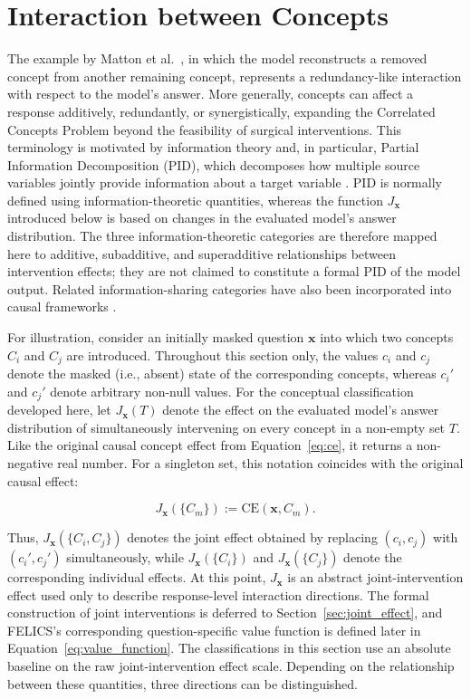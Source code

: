\section{Interaction between Concepts}
\label{sec:interaction_effects}
The example by Matton et al.~\cite{mattonWalkTalkMeasuring2024}, in which the model reconstructs a removed concept from another remaining concept, represents a redundancy-like interaction with respect to the model's answer. More generally, concepts can affect a response additively, redundantly, or synergistically, expanding the Correlated Concepts Problem beyond the feasibility of surgical interventions. This terminology is motivated by information theory and, in particular, Partial Information Decomposition (PID), which decomposes how multiple source variables jointly provide information about a target variable \cite{williamsNonnegativeDecompositionMultivariate2010, kolchinskyNovelApproachPartial2022}. PID is normally defined using information-theoretic quantities, whereas the function $J_{\mathbf{x}}$ introduced below is based on changes in the evaluated model's answer distribution. The three information-theoretic categories are therefore mapped here to additive, subadditive, and superadditive relationships between intervention effects; they are not claimed to constitute a formal PID of the model output. Related information-sharing categories have also been incorporated into causal frameworks \cite{martinez-sanchezDecomposingCausalityIts2024}.

For illustration, consider an initially masked question $\mathbf{x}$ into which two concepts $C_i$ and $C_j$ are introduced. Throughout this section only, the values $c_i$ and $c_j$ denote the masked (i.e., absent) state of the corresponding concepts, whereas $c_i'$ and $c_j'$ denote arbitrary non-null values. For the conceptual classification developed here, let $J_{\mathbf{x}}(T)$ denote the effect on the evaluated model's answer distribution of simultaneously intervening on every concept in a non-empty set $T$. Like the original causal concept effect from Equation~\ref{eq:ce}, it returns a non-negative real number. For a singleton set, this notation coincides with the original causal effect:

\begin{equation}
	J_{\mathbf{x}}(\{C_m\}) := \mathrm{CE}(\mathbf{x},C_m).
\end{equation}

Thus, $J_{\mathbf{x}}(\{C_i,C_j\})$ denotes the joint effect obtained by replacing $(c_i,c_j)$ with $(c_i',c_j')$ simultaneously, while $J_{\mathbf{x}}(\{C_i\})$ and $J_{\mathbf{x}}(\{C_j\})$ denote the corresponding individual effects. At this point, $J_{\mathbf{x}}$ is an abstract joint-intervention effect used only to describe response-level interaction directions. The formal construction of joint interventions is deferred to Section~\ref{sec:joint_effect}, and FELICS's corresponding question-specific value function is defined later in Equation~\ref{eq:value_function}. The classifications in this section use an absolute baseline on the raw joint-intervention effect scale. Depending on the relationship between these quantities, three directions can be distinguished.

